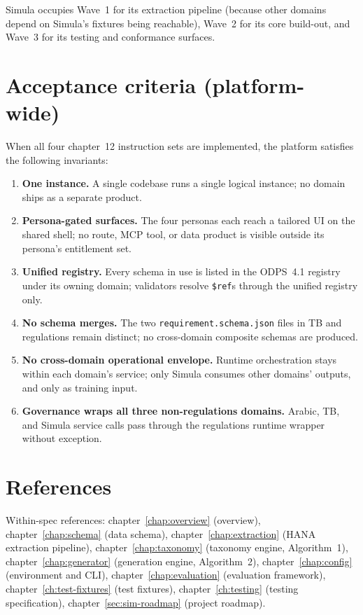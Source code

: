 \documentclass[12pt,a4paper,twoside]{report}
\begin{document}
Simula occupies Wave~1 for its extraction pipeline (because other
domains depend on Simula's fixtures being reachable), Wave~2 for its
core build-out, and Wave~3 for its testing and conformance surfaces.

\section{Acceptance criteria (platform-wide)}
\label{sec:agent-acceptance}
When all four chapter~12 instruction sets are implemented, the
platform satisfies the following invariants:

\begin{enumerate}
\item \textbf{One instance.} A single codebase runs a single
logical instance; no domain ships as a separate product.
\item \textbf{Persona-gated surfaces.} The four personas each
reach a tailored UI on the shared shell; no route, MCP tool, or
data product is visible outside its persona's entitlement set.
\item \textbf{Unified registry.} Every schema in use is listed in
the ODPS~4.1 registry under its owning domain; validators
resolve \texttt{\$ref}s through the unified registry only.
\item \textbf{No schema merges.} The two
\texttt{requirement.schema.json} files in TB and regulations
remain distinct; no cross-domain composite schemas are produced.
\item \textbf{No cross-domain operational envelope.} Runtime
orchestration stays within each domain's service; only Simula
consumes other domains' outputs, and only as training input.
\item \textbf{Governance wraps all three non-regulations domains.}
Arabic, TB, and Simula service calls pass through the
regulations runtime wrapper without exception.
\end{enumerate}

\section{References}
\label{sec:agent-references}
Within-spec references:
chapter~\ref{chap:overview} (overview),
chapter~\ref{chap:schema} (data schema),
chapter~\ref{chap:extraction} (HANA extraction pipeline),
chapter~\ref{chap:taxonomy} (taxonomy engine, Algorithm~1),
chapter~\ref{chap:generator} (generation engine, Algorithm~2),
chapter~\ref{chap:config} (environment and CLI),
chapter~\ref{chap:evaluation} (evaluation framework),
chapter~\ref{ch:test-fixtures} (test fixtures),
chapter~\ref{ch:testing} (testing specification),
chapter~\ref{sec:sim-roadmap} (project roadmap).
\end{document}
